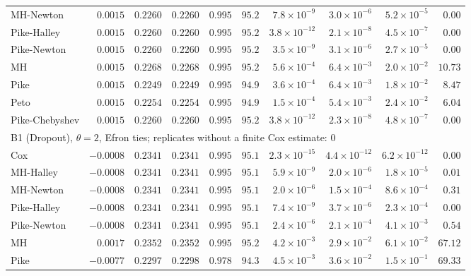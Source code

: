 \begin{landscape}
\begin{longtable}{lrrrrrrrrr}
MH-Newton & $0.0015$ & $0.2260$ & $0.2260$ & $0.995$ & $95.2$ & $7.8 \times 10^{-9}$ & $3.0 \times 10^{-6}$ & $5.2 \times 10^{-5}$ & $0.00$ \\
Pike-Halley & $0.0015$ & $0.2260$ & $0.2260$ & $0.995$ & $95.2$ & $3.8 \times 10^{-12}$ & $2.1 \times 10^{-8}$ & $4.5 \times 10^{-7}$ & $0.00$ \\
Pike-Newton & $0.0015$ & $0.2260$ & $0.2260$ & $0.995$ & $95.2$ & $3.5 \times 10^{-9}$ & $3.1 \times 10^{-6}$ & $2.7 \times 10^{-5}$ & $0.00$ \\
MH & $0.0015$ & $0.2268$ & $0.2268$ & $0.995$ & $95.2$ & $5.6 \times 10^{-4}$ & $6.4 \times 10^{-3}$ & $2.0 \times 10^{-2}$ & $10.73$ \\
Pike & $0.0015$ & $0.2249$ & $0.2249$ & $0.995$ & $94.9$ & $3.6 \times 10^{-4}$ & $6.4 \times 10^{-3}$ & $1.8 \times 10^{-2}$ & $8.47$ \\
Peto & $0.0015$ & $0.2254$ & $0.2254$ & $0.995$ & $94.9$ & $1.5 \times 10^{-4}$ & $5.4 \times 10^{-3}$ & $2.4 \times 10^{-2}$ & $6.04$ \\
Pike-Chebyshev & $0.0015$ & $0.2260$ & $0.2260$ & $0.995$ & $95.2$ & $3.8 \times 10^{-12}$ & $2.3 \times 10^{-8}$ & $4.8 \times 10^{-7}$ & $0.00$ \\
\multicolumn{10}{l}{B1 (Dropout), $\theta = 2$, Efron ties; replicates without a finite Cox estimate: 0} \\
Cox & $-0.0008$ & $0.2341$ & $0.2341$ & $0.995$ & $95.1$ & $2.3 \times 10^{-15}$ & $4.4 \times 10^{-12}$ & $6.2 \times 10^{-12}$ & $0.00$ \\
MH-Halley & $-0.0008$ & $0.2341$ & $0.2341$ & $0.995$ & $95.1$ & $5.9 \times 10^{-9}$ & $2.0 \times 10^{-6}$ & $1.8 \times 10^{-5}$ & $0.01$ \\
MH-Newton & $-0.0008$ & $0.2341$ & $0.2341$ & $0.995$ & $95.1$ & $2.0 \times 10^{-6}$ & $1.5 \times 10^{-4}$ & $8.6 \times 10^{-4}$ & $0.31$ \\
Pike-Halley & $-0.0008$ & $0.2341$ & $0.2341$ & $0.995$ & $95.1$ & $7.4 \times 10^{-9}$ & $3.7 \times 10^{-6}$ & $2.3 \times 10^{-4}$ & $0.00$ \\
Pike-Newton & $-0.0008$ & $0.2341$ & $0.2341$ & $0.995$ & $95.1$ & $2.4 \times 10^{-6}$ & $2.1 \times 10^{-4}$ & $4.1 \times 10^{-3}$ & $0.54$ \\
MH & $0.0017$ & $0.2352$ & $0.2352$ & $0.995$ & $95.2$ & $4.2 \times 10^{-3}$ & $2.9 \times 10^{-2}$ & $6.1 \times 10^{-2}$ & $67.12$ \\
Pike & $-0.0077$ & $0.2297$ & $0.2298$ & $0.978$ & $94.3$ & $4.5 \times 10^{-3}$ & $3.6 \times 10^{-2}$ & $1.5 \times 10^{-1}$ & $69.33$ \\

\end{longtable}
\end{landscape}
